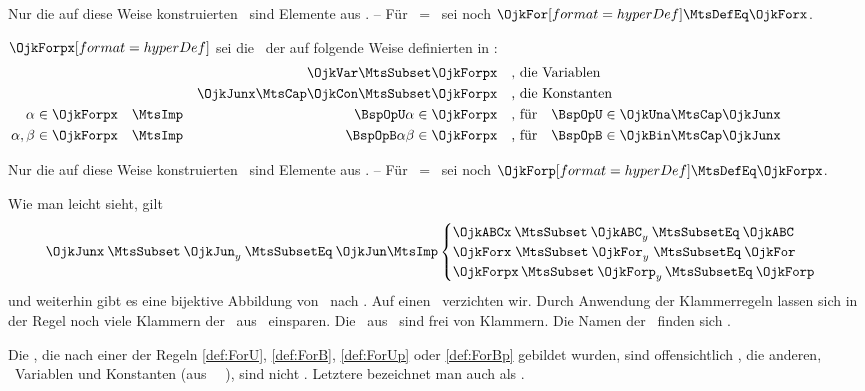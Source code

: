 {Nur die auf diese Weise konstruierten \Formeln\ sind Elemente aus \OjkForx.
-- Für \OjkJunx\ = \OjkJun\ sei noch $\defSym{\OjkFor} \MtsDefEq \OjkForx$.

$\defSym{\OjkForpx}$ sei die \Menge\ der auf folgende Weise definierten  in :
\begin{align}
&                          & \OjkVar                   \MtsSubset \OjkForpx
&&& \text{, die Variablen}  \label{def:ForQp}
\\
&                          & \OjkJunx \MtsCap \OjkCon   \MtsSubset \OjkForpx
&&& \text{, die Konstanten} \label{def:ForJKp}
\\
\alpha      \in\OjkForpx & \quad\MtsImp & \BspOpU\alpha \in\OjkForpx
&&& \text{, für}  \quad \BspOpU \in \OjkUna  \MtsCap \OjkJunx
\label{def:ForUp}
\\
\alpha,\beta\in\OjkForpx & \quad\MtsImp & \BspOpB\alpha\beta\in\OjkForpx
&&& \text{, für}  \quad \BspOpB  \in \OjkBin  \MtsCap \OjkJunx
\label{def:ForBp} \formulatoleft
\end{align}

Nur die auf diese Weise konstruierten \Formeln\ sind Elemente aus \OjkForpx.
-- Für \OjkJunx\ = \OjkJun\ sei noch $\defSym{\OjkForp} \MtsDefEq \OjkForpx$.

Wie man leicht sieht, gilt
\begin{equation}
\OjkJunx      \: \MtsSubset \: \OjkJun_y  \: \MtsSubsetEq \: \OjkJun \MtsImp
\begin{cases}
\OjkABCx  \: \MtsSubset \: \OjkABC_y  \: \MtsSubsetEq \: \OjkABC \\
\OjkForx  \; \MtsSubset \: \OjkFor_y  \; \MtsSubsetEq \: \OjkFor \\
\OjkForpx \, \MtsSubset \: \OjkForp_y \, \MtsSubsetEq \: \OjkForp
\end{cases}
\end{equation}
und weiterhin gibt es eine bijektive Abbildung von \OjkFor\ nach \OjkForp. Auf einen \Beweis\ verzichten wir.
%
Durch Anwendung der Klammerregeln  lassen sich in der Regel noch viele Klammern der \Formeln\ aus \OjkForx\ einsparen.
Die \Formeln\ aus \OjkForpx\ sind frei von Klammern.
Die Namen der \Junktoren\ finden sich .

Die \Formeln, die nach einer der Regeln \eqref{def:ForU}, \eqref{def:ForB}, \eqref{def:ForUp} oder \eqref{def:ForBp} gebildet wurden, sind offensichtlich \zerlegbar, die anderen, \textdh\ Variablen und Konstanten (aus \OjkVar\ \textbzw\ \OjkCon), sind nicht \zerlegbar. Letztere bezeichnet man auch als .

}
